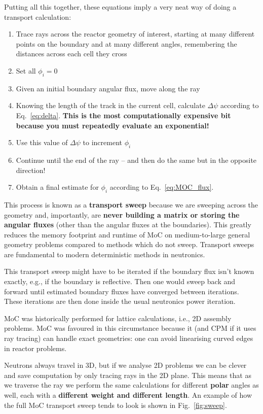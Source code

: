 \documentclass{article}
\begin{document}
Putting all this together, these equations imply a very neat way of doing a transport calculation:
\begin{enumerate}
	\item Trace rays across the reactor geometry of interest, starting at many different points on the boundary and at many different angles, remembering the distances across each cell they cross
	\item Set all $\phi_i = 0$
	\item Given an initial boundary angular flux, move along the ray
	\item Knowing the length of the track in the current cell, calculate $\Delta\psi$ according to Eq.~\eqref{eq:delta}. \textbf{This is the most computationally expensive bit because you must repeatedly evaluate an exponential!}
	\item Use this value of $\Delta\psi$ to increment $\phi_i$
	\item Continue until the end of the ray -- and then do the same but in the opposite direction!
	\item Obtain a final estimate for $\phi_i$ according to Eq.~\eqref{eq:MOC_flux}.
\end{enumerate}
This process is known as a \textbf{transport sweep} because we are sweeping across the geometry and, importantly, are \textbf{never building a matrix or storing the angular fluxes} (other than the angular fluxes at the boundaries). This greatly reduces the memory footprint and runtime of MoC on medium-to-large general geometry problems compared to methods which do not sweep. Transport sweeps are fundamental to modern deterministic methods in neutronics.

This transport sweep might have to be iterated if the boundary flux isn't known exactly, e.g., if the boundary is reflective. Then one would sweep back and forward until estimated boundary fluxes have converged between iterations. These iterations are then done inside the usual neutronics power iteration.

MoC was historically performed for lattice calculations, i.e., 2D assembly problems. MoC was favoured in this circumstance because it (and CPM if it uses ray tracing) can handle exact geometries: one can avoid linearising curved edges in reactor problems. 

Neutrons always travel in 3D, but if we analyse 2D problems we can be clever and save computation by only tracing rays in the 2D plane. This means that as we traverse the ray we perform the same calculations for different \textbf{polar} angles as well, each with a \textbf{different weight and different length}. An example of how the full MoC transport sweep tends to look is shown in Fig.~\ref{fig:sweep}.
\end{document}
